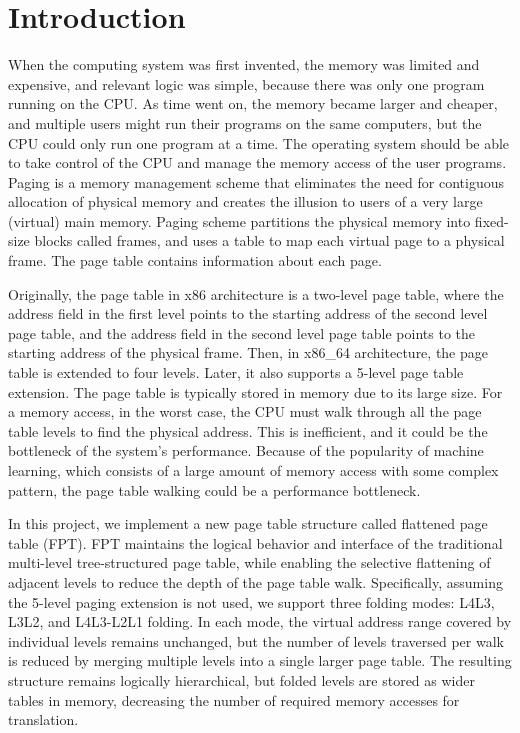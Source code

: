 \section{Introduction}
\label{sec:introduction}

When the computing system was first invented, the memory was limited and expensive, and relevant logic was simple, because there was only one program running on the CPU. As time went on, the memory became larger and cheaper, and multiple users might run their programs on the same computers, but the CPU could only run one program at a time. The operating system should be able to take control of the CPU and manage the memory access of the user programs. Paging is a memory management scheme that eliminates the need for contiguous allocation of physical memory and creates the illusion to users of a very large (virtual) main memory. Paging scheme partitions the physical memory into fixed-size blocks called frames, and uses a table to map each virtual page to a physical frame. The page table contains information about each page.

Originally, the page table in x86 architecture is a two-level page table, where the address field in the first level points to the starting address of the second level page table, and the address field in the second level page table points to the starting address of the physical frame. Then, in x86\_64 architecture, the page table is extended to four levels. Later, it also supports a 5-level page table extension. The page table is typically stored in memory due to its large size. For a memory access, in the worst case, the CPU must walk through all the page table levels to find the physical address. This is inefficient, and it could be the bottleneck of the system's performance. Because of the popularity of machine learning, which consists of a large amount of memory access with some complex pattern, the page table walking could be a performance bottleneck.

In this project, we implement a new page table structure called flattened page table (FPT). FPT maintains the logical behavior and interface of the traditional multi-level tree-structured page table, while enabling the selective flattening of adjacent levels to reduce the depth of the page table walk. Specifically, assuming the 5-level paging extension is not used, we support three folding modes: L4L3, L3L2, and L4L3-L2L1 folding. In each mode, the virtual address range covered by individual levels remains unchanged, but the number of levels traversed per walk is reduced by merging multiple levels into a single larger page table. The resulting structure remains logically hierarchical, but folded levels are stored as wider tables in memory, decreasing the number of required memory accesses for translation. %
